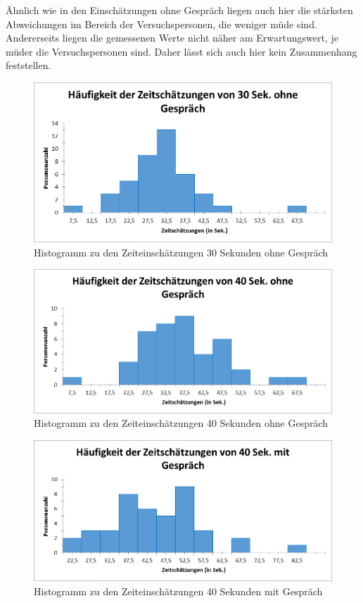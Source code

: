 \documentclass{Paper}
\begin{document}
Ähnlich wie in den Einschätzungen ohne Gespräch liegen auch hier die stärksten Abweichungen im Bereich der Versuchspersonen, die weniger müde sind. Andererseits liegen die gemessenen Werte nicht näher am Erwartungswert, je müder die Versuchspersonen sind. Daher lässt sich auch hier kein Zusammenhang feststellen.\\


\begin{figure}[H]
	\centering
	\includegraphics[scale=0.7]{../Diagramme/histopre/30ohne_variante3.png}
	\caption{Histogramm zu den Zeiteinschätzungen 30 Sekunden ohne Gespräch}
	\label{img:histpre30}
\end{figure}
\begin{figure}[H]
	\centering
	\includegraphics[scale=0.7]{../Diagramme/histopre/40ohne_variante3.png}
	\caption{Histogramm zu den Zeiteinschätzungen 40 Sekunden ohne Gespräch}
	\label{img:histpre40ohne}
\end{figure}
\begin{figure}[H]
	\centering
	\includegraphics[scale=0.7]{../Diagramme/histopre/40mit_variante3.png}
	\caption{Histogramm zu den Zeiteinschätzungen 40 Sekunden mit Gespräch}
	\label{img:histpre40mit}
\end{figure}
\end{document}
